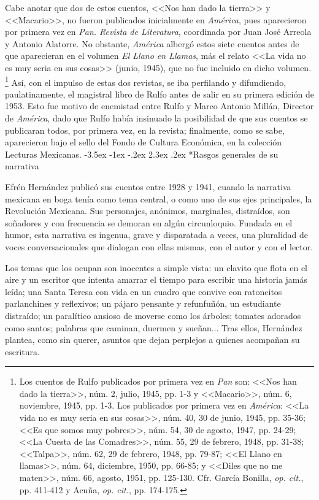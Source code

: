 \documentclass[14pt,twoside,final]{extbook} %
\makeatletter
\let\oldfootnote\footnote
\renewcommand\footnote[1]{%
\oldfootnote{\hspace{1mm}#1}}
\renewcommand\section{\@startsection {section}{1}{\z@}%
                                     {-3.5ex \@plus -1ex \@minus -.2ex}%
                                     {2.3ex \@plus .2ex}%
                                     {\normalfont\large\bfseries\sc}}
\makeatother
\begin{document}
Cabe anotar que dos de estos cuentos, <<Nos han dado la tierra>> y <<Macario>>, no fueron publicados inicialmente en \emph{América}, pues aparecieron por primera vez en \emph{Pan. Revista de Literatura}, coordinada por Juan José Arreola y Antonio Alatorre. No obstante, \emph{América} albergó estos siete cuentos antes de que aparecieran en el volumen \emph{El Llano en Llamas}, más el relato <<La vida no es muy seria en sus cosas>> (junio, 1945), que no fue incluido en dicho volumen.\footnote{Los cuentos de Rulfo publicados por primera vez en \emph{Pan} son: <<Nos han dado la tierra>>, núm. 2, julio, 1945, pp. 1-3 y <<Macario>>, núm. 6, noviembre, 1945, pp. 1-3. Los publicados por primera vez en \emph{América}: <<La vida no es muy seria en sus cosas>>, núm. 40, 30 de junio, 1945, pp. 35-36; <<Es que somos muy pobres>>, núm. 54, 30 de agosto, 1947, pp. 24-29; <<La Cuesta de las Comadres>>, núm. 55, 29 de febrero, 1948, pp. 31-38; <<Talpa>>, núm. 62, 29 de febrero, 1948, pp. 79-87; <<El Llano en llamas>>, núm. 64, diciembre, 1950, pp. 66-85; y <<Diles que no me maten>>, núm. 66, agosto, 1951, pp. 125-130. Cfr. García Bonilla, \emph{op. cit.}, pp. 411-412 y Acuña, \emph{op. cit.}, pp. 174-175.} Así, con el impulso de estas dos revistas, se iba perfilando y difundiendo, paulatinamente, el magistral libro de Rulfo antes de salir en su primera edición de 1953. Esto fue motivo de enemistad entre Rulfo y Marco Antonio Millán, Director de \emph{América}, dado que Rulfo había insinuado la posibilidad de que sus cuentos se publicaran todos, por primera vez, en la revista; finalmente, como se sabe, aparecieron bajo el sello del Fondo de Cultura Económica, en la colección Lecturas Mexicanas.
\section*{Rasgos generales de su narrativa}\label{sec:rasgos-generales-de-su-narrativa}
Efrén Hernández publicó sus cuentos entre 1928 y 1941, cuando la narrativa mexicana en boga tenía como tema central, o como uno de sus ejes principales, la Revolución Mexicana. Sus personajes, anónimos, marginales, distraídos, son soñadores y con frecuencia se demoran en algún circunloquio. Fundada en el humor, esta narrativa es ingenua, grave y disparatada a veces, una pluralidad de voces conversacionales que dialogan con ellas mismas, con el autor y con el lector.

Los temas que los ocupan son inocentes a simple vista: un clavito que flota en el aire y un escritor que intenta amarrar el tiempo para escribir una historia jamás leída; una Santa Teresa con vida en un cuadro que convive con ratoncitos parlanchines y reflexivos; un pájaro pensante y refunfuñón, un estudiante distraído; un paralítico ansioso de moverse como los árboles; tomates adorados como santos; palabras que caminan, duermen y sueñan... Tras ellos, Hernández plantea, como sin querer, asuntos que dejan perplejos a quienes acompañan su escritura.
\end{document}
